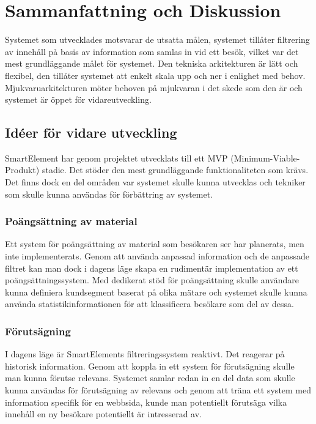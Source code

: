 \section{Sammanfattning och Diskussion}

Systemet som utvecklades motsvarar de utsatta målen, systemet tillåter filtrering av innehåll på basis av information som samlas in vid ett besök, vilket var det mest grundläggande målet för systemet. Den tekniska arkitekturen är lätt och flexibel, den tillåter systemet att enkelt skala upp och ner i enlighet med behov. Mjukvaruarkitekturen möter behoven på mjukvaran i det skede som den är och systemet är öppet för vidareutveckling.

\subsection{Idéer för vidare utveckling}

SmartElement har genom projektet utvecklats till ett MVP (Minimum-Viable-Produkt) stadie. Det stöder den mest grundläggande funktionaliteten som krävs. Det finns dock en del områden var systemet skulle kunna utvecklas och tekniker som skulle kunna användas för förbättring av systemet.

\subsubsection{Poängsättning av material}

Ett system för poängsättning av material som besökaren ser har planerats, men inte implementerats. Genom att använda anpassad information och de anpassade filtret kan man dock i dagens läge skapa en rudimentär implementation av ett poängsättningssystem. Med dedikerat stöd för poängsättning skulle användare kunna definiera kundsegment baserat på olika mätare och systemet skulle kunna använda statistikinformationen för att klassificera besökare som del av dessa.

\subsubsection{Förutsägning}

I dagens läge är SmartElements filtreringssystem reaktivt. Det reagerar på historisk information. Genom att koppla in ett system för förutsägning skulle man kunna förutse relevans. Systemet samlar redan in en del data som skulle kunna användas för förutsägning av relevans och genom att träna ett system med information specifik för en webbsida, kunde man potentiellt förutsäga vilka innehåll en ny besökare potentiellt är intresserad av.



